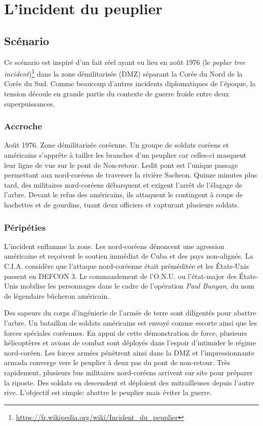 \chapter{L'incident du peuplier}

\section{Scénario}

Ce scénario est inspiré d'un fait réel ayant eu lieu en août 1976 (le \emph{poplar tree incident})\footnote{\url{https://fr.wikipedia.org/wiki/Incident_du_peuplier}} dans la zone démilitarisée (DMZ) séparant la Corée du Nord de la Corée du Sud.
Comme beaucoup d'autres incidents diplomatiques de l'époque, la tension découle en grande partie du contexte de guerre froide entre deux superpuissances.

\subsection{Accroche}

Août 1976. Zone démilitarisée coréenne. Un groupe de soldats coréens et américains s'apprête à tailler les branches d'un peuplier car celles-ci masquent leur ligne de vue sur le \og pont de Non-retour\fg.
Ledit pont est l'unique passage permettant aux nord-coréens de traverser la rivière Sacheon.
Quinze minutes plus tard, des militaires nord-coréens débarquent et exigent l'arrêt de l'élagage de l'arbre.
Devant le refus des américains, ils attaquent le contingent à coups de hachettes et de gourdins, tuant deux officiers et capturant plusieurs soldats.

\subsection{Péripéties}

L'incident enflamme la zone.
Les nord-coréens dénoncent une agression américaine et reçoivent le soutien immédiat de Cuba et des pays non-alignés.
La C.I.A. considère que l'attaque nord-coréenne était préméditée et les États-Unis passent en DEFCON 3.
Le commandement de l'O.N.U. ou l'état-major des États-Unis mobilise les personnages dans le cadre de l'opération \emph{Paul Bunyan}, du nom de légendaire bûcheron américain.

Des sapeurs du corps d'ingénierie de l'armée de terre sont diligentés pour abattre l'arbre.
Un bataillon de soldats américains est envoyé comme escorte ainsi que les forces spéciales coréennes.
En appui de cette démonstration de force, plusieurs hélicoptères et avions de combat sont déployés dans l'espoir d'intimider le régime nord-coréen.
Les forces armées pénètrent ainsi dans la DMZ et l'impressionnante armada converge vers le peuplier à deux pas du pont de non-retour.
Très rapidement, plusieurs bus militaires nord-coréens arrivent sur site pour préparer la riposte.
Des soldats en descendent et déploient des mitrailleuses depuis l'autre rive.
L'objectif est simple: abattre le peuplier mais éviter la guerre.

